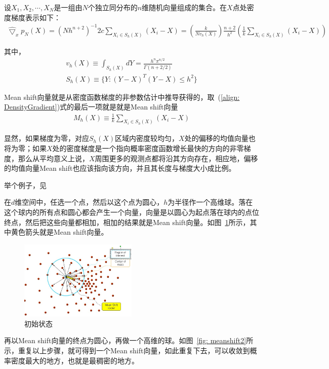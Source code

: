 \documentclass[12pt]{article}
\begin{document}
设$X_1, X_2, \cdots, X_N$是一组由$N$个独立同分布的$n$维随机向量组成的集合。在$X$点处密度梯度表示如下：
\begin{align}
\label{align: DensityGradient}
\hat{\bigtriangledown}_x p_N(X) = (Nh^{n+2})^{-1}2c \sum_{X_i \in S_h(X)} (X_i - X) = \left(\frac{k}{Nv_h(X)}\right) \frac{n+2}{h^2} \left(\frac{1}{k} \sum_{X_i \in S_h(X)} (X_i - X)\right)
\end{align}

其中，
\begin{align}
v_h(X) \equiv \int_{S_h(X)}dY = \frac{h^n\pi^{n/2}}{\Gamma(n+2/2)}\\
S_h(X) \equiv \{Y:(Y-X)^T(Y-X) \le h^2\}
\end{align}

Mean shift向量就是从密度函数梯度的非参数估计中推导获得的，取~(\ref{align: DensityGradient})式的最后一项就是就是Mean shift向量
\begin{align}
M_h(X) \equiv \frac{1}{k} \sum_{X_i \in S_h(X)} (X_i-X)
\end{align}

显然，如果梯度为零，对应$S_h(X)$区域内密度较均匀，$X$处的偏移的均值向量也将为零；如果$X$处的密度梯度是一个指向概率密度函数增长最快的方向的非零梯度，那么从平均意义上说，$X$周围更多的观测点都将沿其方向存在，相应地，偏移的均值向量Mean shift也应该指向该方向，并且其长度与梯度大小成比例。

举个例子，见\cite{MeanShiftExample}

在$d$维空间中，任选一个点，然后以这个点为圆心，$h$为半径作一个高维球。落在这个球内的所有点和圆心都会产生一个向量，向量是以圆心为起点落在球内的点位终点，然后把这些向量都相加，相加的结果就是Mean shift向量。如图~\ref{fig: meanshift1}所示，其中黄色箭头就是Mean shift向量。

\begin{figure}[!ht]
\centering
\includegraphics[width=0.5\textwidth]{meanshift1.jpg}
\caption{初始状态}
\label{fig: meanshift1}
\end{figure} 


再以Mean shift向量的终点为圆心，再做一个高维的球。如图~\ref{fig: meanshift2}所示，重复以上步骤，就可得到一个Mean shift向量，如此重复下去，可以收敛到概率密度最大的地方，也就是最稠密的地方。
\end{document}
